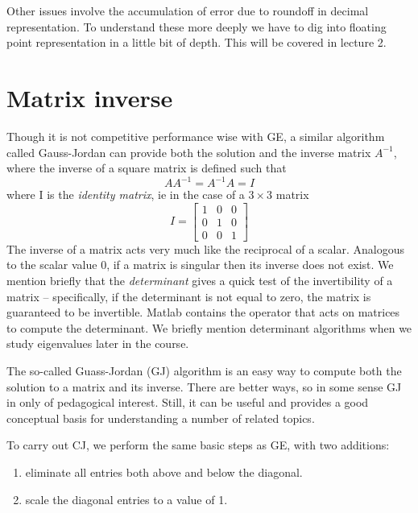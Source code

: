 \documentclass[11pt]{article}
\begin{document}
Other issues involve the accumulation of error due to roundoff in decimal representation. To understand
these more deeply we have to dig into floating point representation in a little bit of depth. This will be
covered in lecture 2. 

\section{Matrix inverse}
Though it is not competitive performance wise with GE, a similar algorithm called Gauss-Jordan can provide
both the solution and the inverse matrix $A^{-1}$, where the inverse of a square matrix is defined such that
$$A A^{-1} = A^{-1} A = I$$ where I is the {\it identity matrix}, ie in the case of a $3\times3$ matrix
\[
I = 
\begin{bmatrix}
1 & 0 & 0 \\ 0 & 1 & 0 \\ 0 & 0 & 1
\end{bmatrix}
\]
The inverse of a matrix acts very much like the reciprocal of a scalar. Analogous to the scalar value 0, if a matrix
is singular then its inverse does not exist. We mention briefly that the {\it determinant} gives a quick test
of the invertibility of a matrix -- specifically, if the determinant is not equal to zero, the matrix is guaranteed
to be invertible. Matlab contains the {\it} operator that acts on matrices to compute the determinant.
We briefly mention determinant algorithms when we study eigenvalues later in the course.

The so-called Guass-Jordan (GJ) algorithm is an easy way to compute both the solution to a matrix and its inverse.
There are better ways, so in some sense GJ in only of pedagogical interest. Still, it can be useful and provides a good
conceptual basis for understanding a number of related topics.

To carry out CJ, we perform the same basic steps as GE, with two additions:
\begin{enumerate}
\item eliminate all entries both above and below the diagonal.
\item scale the diagonal entries to a value of 1.
\end{enumerate}
\end{document}
